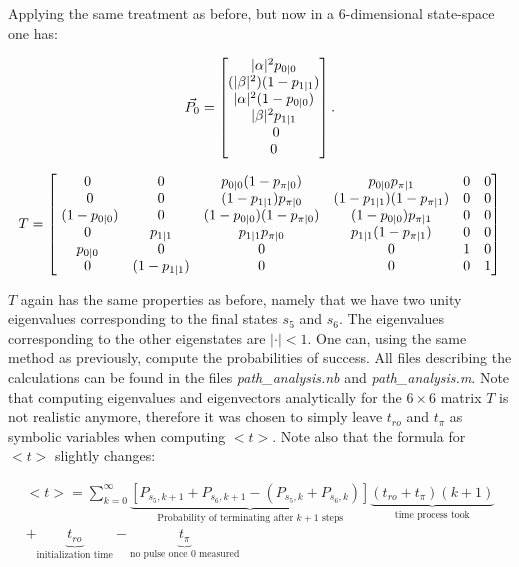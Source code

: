 Applying the same treatment as before, but now in a 6-dimensional state-space one has: 

\begin{equation}
    \Vec{P_0} = \bmat{\abs{\alpha}^2 p_{0|0}\\(\abs{\beta}^2) (1 - p_{1|1})\\\abs{\alpha}^2(1- p_{0|0})\\\abs{\beta}^2 p_{1|1} \\ 0 \\ 0}. \label{eq:Pk6}
\end{equation}

\begin{equation}
    T = \bmat{0 & 0 & p_{0|0}(1-p_{\pi|0}) & p_{0|0} p_{\pi|1} & 0 & 0 \\ 
    0 & 0 & (1-p_{1|1})p_{\pi|0} & (1-p_{1|1})(1-p_{\pi|1}) & 0 & 0 \\ 
    (1-p_{0|0}) & 0 & (1-p_{0|0})(1-p_{\pi|0}) & (1-p_{0|0})p_{\pi|1} & 0 & 0 \\
    0 & p_{1|1} & p_{1|1}p_{\pi|0} & p_{1|1}(1-p_{\pi|1}) & 0 & 0\\ 
    p_{0|0} & 0 & 0 & 0 & 1 & 0 \\
    0 & (1-p_{1|1}) & 0 & 0 & 0 & 1}
\end{equation}

$T$ again has the same properties as before, namely that we have two unity eigenvalues corresponding to the final states $s_5$ and $s_6$. The eigenvalues corresponding to the other eigenstates are $|\cdot| < 1$. One can, using the same method as previously, compute the probabilities of success. All files describing the calculations can be found in the files \textit{path\_analysis.nb} and \textit{path\_analysis.m}. Note that computing eigenvalues and eigenvectors analytically for the $6\times6$ matrix $T$ is not realistic anymore, therefore it was chosen to simply leave $t_{ro}$ and $t_{\pi}$ as symbolic variables when computing $<t>$. Note also that the formula for $<t>$ slightly changes: 

\begin{equation}
\begin{split}
    < t > = \sum_{k = 0 }^\infty \underbrace{\left[P_{s_5,k+1} + P_{s_6,k+1} - (P_{s_5,k} + P_{s_6,k})\right]}_{\text{Probability of terminating after } k+1 \text{ steps}}\underbrace{(t_{ro} + t_\pi)(k+1)}_{\text{time process took}} \\ + \underbrace{t_{ro}}_{\text{initialization time}} - \underbrace{t_{\pi}}_{\text{no pulse once 0 measured}}\\ 
\end{split}
\end{equation}

